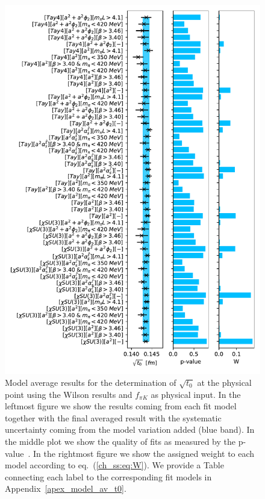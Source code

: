 {\begin{figure}
    \centering
    \includegraphics[width=1.\textwidth]{./cap5/figs/BMA_w.pdf}
    \caption{Model average results for the determination of $\sqrt{t_0}$ at the physical point using the Wilson results and $f_{\pi K}$ as physical input. In the leftmost figure we show the results coming from each fit model together with the final averaged result with the systematic uncertainty coming from the model variation added (blue band). In the middle plot we show the quality of fits as measured by the p-value~\citep{Bruno:2022mfy}. In the rightmost figure we show the assigned weight to each model according to eq.~(\ref{ch_ss:eq:W}). We provide a Table connecting each label to the corresponding fit models in Appendix~\ref{apex_model_av_t0}.}
    \label{ch_ss:fig:BMA_w}
\end{figure}

}
